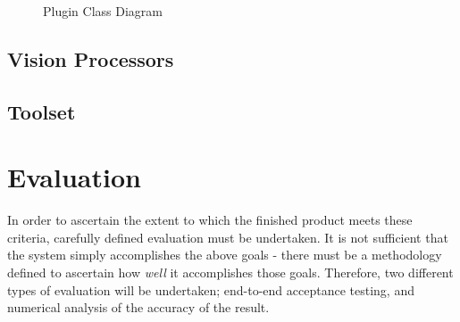 \documentclass[a4paper,10pt]{article}
\begin{document}
\begin{figure}
\begin{center}
        \normalsize
  \end{center}
  \caption{Plugin Class Diagram}
  \label{pluginclasses}
\end{figure}

\subsection{Vision Processors}

\subsection{Toolset}

\section{Evaluation}
In order to ascertain the extent to which the finished product meets these criteria, carefully defined evaluation must be undertaken. It is not sufficient that the system simply accomplishes the above goals - there must be a methodology defined to ascertain how \textit{well} it accomplishes those goals. Therefore, two different types of evaluation will be undertaken; end-to-end acceptance testing, and numerical analysis of the accuracy of the result.
\end{document}
